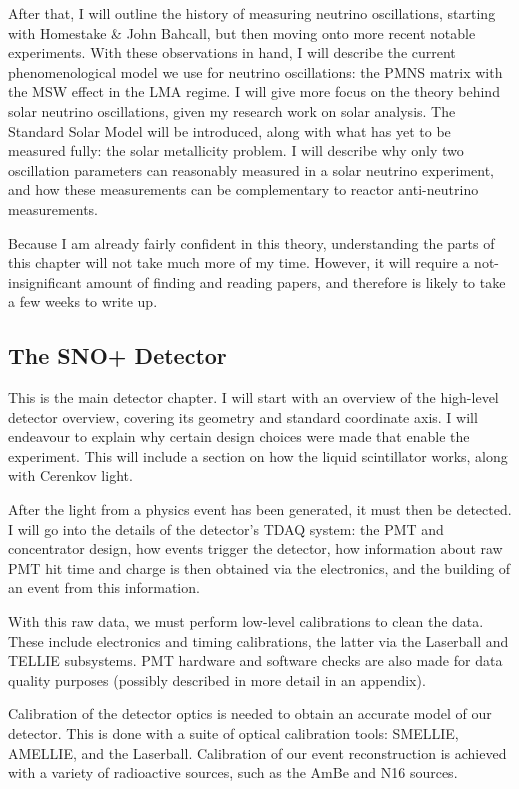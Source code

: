 After that, I will outline the history of measuring neutrino oscillations, starting with Homestake \& John Bahcall, but then moving onto more recent notable experiments. With these observations in hand, I will describe the current phenomenological model we use for neutrino oscillations: the PMNS matrix with the MSW effect in the LMA regime. I will give more focus on the theory behind solar neutrino oscillations, given my research work on solar analysis. The Standard Solar Model will be introduced, along with what has yet to be measured fully: the solar metallicity problem. I will describe why only two oscillation parameters can reasonably measured in a solar neutrino experiment, and how these measurements can be complementary to reactor anti-neutrino measurements.

Because I am already fairly confident in this theory, understanding the parts of this chapter will not take much more of my time. However, it will require a not-insignificant amount of finding and reading papers, and therefore is likely to take a few weeks to write up.

\subsection{The SNO+ Detector}
This is the main detector chapter. I will start with an overview of the high-level detector overview, covering its geometry and standard coordinate axis. I will endeavour to explain why certain design choices were made that enable the experiment. This will include a section on how the liquid scintillator works, along with Cerenkov light.

After the light from a physics event has been generated, it must then be detected. I will go into the details of the detector's TDAQ system: the PMT and concentrator design, how events trigger the detector, how information about raw PMT hit time and charge is then obtained via the electronics, and the building of an event from this information.

With this raw data, we must perform low-level calibrations to clean the data. These include electronics and timing calibrations, the latter via the Laserball and TELLIE subsystems. PMT hardware and software checks are also made for data quality purposes (possibly described in more detail in an appendix).

Calibration of the detector optics is needed to obtain an accurate model of our detector. This is done with a suite of optical calibration tools: SMELLIE, AMELLIE, and the Laserball. Calibration of our event reconstruction is achieved with a variety of radioactive sources, such as the AmBe and N16 sources.

